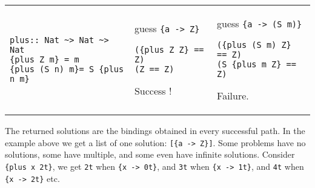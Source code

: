 \documentclass[11pt,twoside]{article}
\begin{document}
\vspace*{.20in}
\begin{tabular}{l|l|l}
\begin{minipage}[t]{2.25in}
{ %
\begin{verbatim}
plus:: Nat ~> Nat ~> Nat
{plus Z m} = m
{plus (S n) m}= S {plus n m}
\end{verbatim}}
\end{minipage}
&
\begin{minipage}[t]{1.5in}
{ %
guess \verb+{a -> Z}+
\begin{verbatim}
({plus Z Z} == Z)
(Z == Z)
\end{verbatim}}
Success !
\end{minipage}
&
\begin{minipage}[t]{1.6in}
{ %
guess \verb+{a -> (S m)}+
\begin{verbatim}
({plus (S m) Z} == Z)
(S {plus m Z} == Z)
\end{verbatim}}
Failure. 
\end{minipage}
\end{tabular}

\vspace*{0.15in}

The returned solutions are the bindings obtained in every
successful path. In the example above we get a list of one
solution: \verb+[{a -> Z}]+. Some problems have no
solutions, some have multiple, and some even have infinite
solutions. Consider  \verb+{plus x 2t}+, we get
\verb+2t+ when \verb+{x -> 0t}+, and 
\verb+3t+ when \verb+{x -> 1t}+, and
\verb+4t+ when \verb+{x -> 2t}+ etc.
\end{document}

